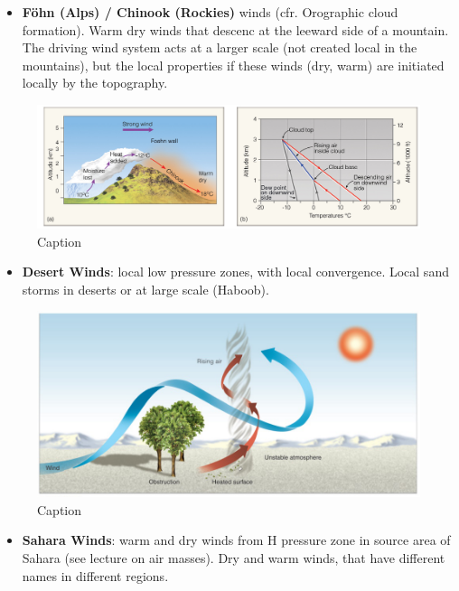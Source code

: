 \documentclass[12pt,oneside]{book}
\providecommand{\tightlist}{%
  \setlength{\itemsep}{0pt}\setlength{\parskip}{0pt}}
\begin{document}
\begin{itemize}
\tightlist
\item
  \textbf{Föhn (Alps) / Chinook (Rockies)} winds (cfr. Orographic cloud
  formation). Warm dry winds that descenc at the leeward side of a
  mountain. The driving wind system acts at a larger scale (not created
  local in the mountains), but the local properties if these winds (dry,
  warm) are initiated locally by the topography.
\end{itemize}

\begin{figure}

{\centering \includegraphics[width=0.6\linewidth]{figures/Figure428} 

}

\caption{Caption}\label{fig:Fohn}
\end{figure}

\begin{itemize}
\tightlist
\item
  \textbf{Desert Winds}: local low pressure zones, with local
  convergence. Local sand storms in deserts or at large scale (Haboob).
\end{itemize}

\begin{figure}

{\centering \includegraphics[width=0.6\linewidth]{figures/Figure429} 

}

\caption{Caption}\label{fig:DesertW}
\end{figure}

\begin{itemize}
\tightlist
\item
  \textbf{Sahara Winds}: warm and dry winds from H pressure zone in
  source area of Sahara (see lecture on air masses). Dry and warm winds,
  that have different names in different regions.
\end{itemize}
\end{document}
